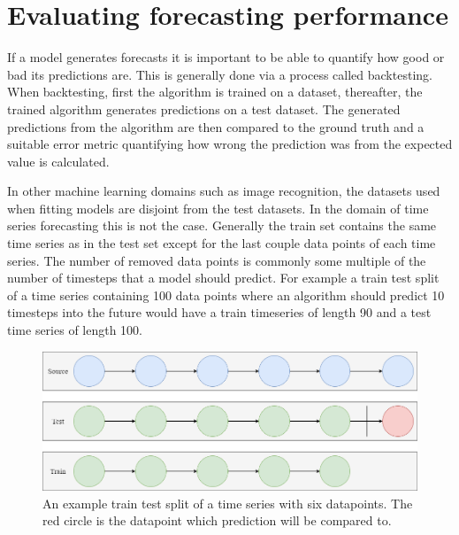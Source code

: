 \section{Evaluating forecasting performance}
If a model generates forecasts it is important to be able to quantify how good or bad its predictions are. This is generally done via a process called backtesting. When backtesting, first the algorithm is trained on a dataset, thereafter, the trained algorithm generates predictions on a test dataset. The generated predictions from the algorithm are then compared to the ground truth and a suitable error metric quantifying how wrong the prediction was from the expected value is calculated. 

In other machine learning domains such as image recognition, the datasets used when fitting models are disjoint from the test datasets. In the domain of time series forecasting this is not the case. Generally the train set contains the same time series as in the test set except for the last couple data points of each time series. The number of removed data points is commonly some multiple of the number of timesteps that a model should predict. For example a train test split of a time series containing 100 data points where an algorithm should predict 10 timesteps into the future would have a train timeseries of length 90 and a test time series of length 100. 

\begin{figure}[htb]
    \centering
        \includegraphics[width=\linewidth]{2_background/figures/train_test_split.png}
        \caption{An example train test split of a time series with six datapoints. The red circle is the datapoint which prediction will be compared to.}
    \endminipage\hfill
\end{figure}
\label{fig:train_test_split}

